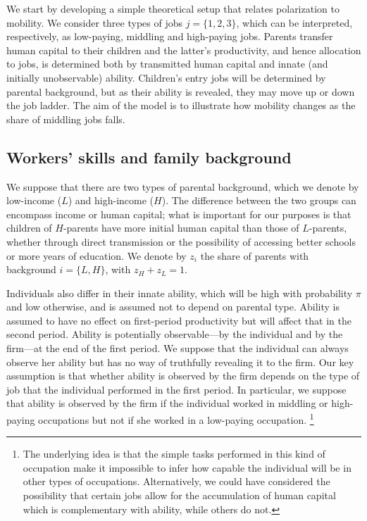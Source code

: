 We start by developing a simple theoretical setup that relates polarization to mobility. We consider three types of jobs $j = \{1,2,3\}$, which can be interpreted, respectively, as low-paying, middling and high-paying jobs. Parents transfer human capital to their children and the latter’s productivity, and hence allocation to jobs, is determined both by transmitted human capital and innate (and initially unobservable) ability. Children’s entry jobs will be determined by parental background, but as their ability is revealed, they may move up or down the job ladder. The aim of the model is to illustrate how mobility changes as the share of middling jobs falls.

\subsection{Workers' skills and family background} \label{chap2-model-workers}

We suppose that there are two types of parental background, which we denote by low-income ($L$) and high-income ($H$). The difference between the two groups can encompass income or human capital; what is important for our purposes is that children of $H$-parents have more initial human capital than those of $L$-parents, whether through direct transmission or the possibility of accessing better schools or more years of education. We denote by $z_i$ the share of parents with background $i = \{L,H\}$, with $z_H + z_L = 1$.

Individuals also differ in their innate ability, which will be high with probability $\pi$ and low otherwise, and is assumed not to depend on parental type. Ability is assumed to have no effect on first-period productivity but will affect that in the second period. Ability is potentially observable---by the individual and by the firm---at the end of the first period. We suppose that the individual can always observe her ability but has no way of truthfully revealing it to the firm. Our key assumption is that whether ability is observed by the firm depends on the type of job that the individual performed in the first period. In particular, we suppose that ability is observed by the firm if the individual worked in middling or high-paying occupations but not if she worked in a low-paying occupation. \footnote{The underlying idea is that the simple tasks performed in this kind of occupation make it impossible to infer how capable the individual will be in other types of occupations. Alternatively, we could have considered the possibility that certain jobs allow for the accumulation of human capital which is complementary with ability, while others do not.} 

